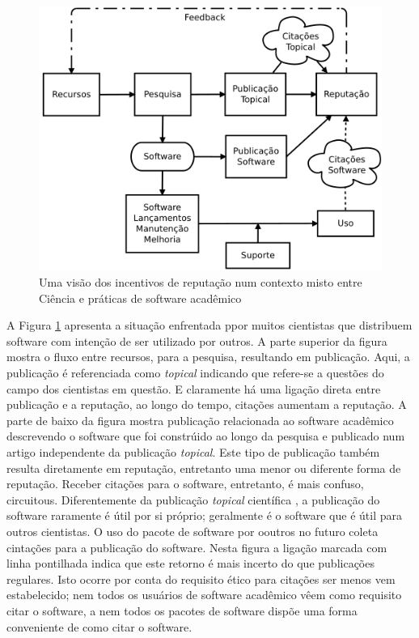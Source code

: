 \begin{figure}[h]
  \center
  \includegraphics[scale=0.35]{imagens/scientific-reputation-diagram.png}
  \caption{Uma visão dos incentivos de reputação num contexto misto entre Ciência e práticas de software acadêmico \cite{howison2011scientific}}
  \label{scientific-reputation-diagram}
\end{figure}

A Figura \ref{scientific-reputation-diagram} apresenta a situação enfrentada
ppor muitos cientistas que distribuem software com intenção de ser utilizado
por outros. A parte superior da figura mostra o fluxo entre recursos, para a pesquisa,
resultando em publicação. Aqui, a publicação é referenciada como {\it topical} indicando
que refere-se a questões do campo dos cientistas em questão. E claramente há uma
ligação direta entre publicação e a reputação, ao longo do tempo, citações aumentam a reputação.
A parte de baixo da figura mostra publicação relacionada ao software acadêmico descrevendo
o software que foi constrúido ao longo da pesquisa e publicado num artigo independente da publicação
{\it topical}. Este tipo de publicação também resulta diretamente em reputação, entretanto uma
menor ou diferente forma de reputação. Receber citações para o software, entretanto, é mais confuso, circuitous.
Diferentemente da publicação {\it topical} científica , a publicação do
software raramente é útil por si próprio; geralmente é o software que é útil para
outros cientistas. O uso do pacote de software por ooutros no futuro coleta cintações para a
publicação do software. Nesta figura a ligação marcada com linha pontilhada indica que este
retorno é mais incerto do que publicações regulares. Isto ocorre por conta do requisito ético
para citações ser menos vem estabelecido; nem todos os usuários de software acadêmico
vêem como requisito citar o software, a nem todos os pacotes de software dispõe
uma forma conveniente de como citar o software.

